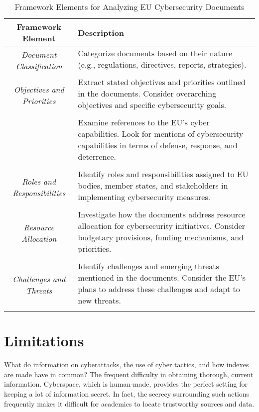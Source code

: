 \begin{table}[ht]
\centering
\caption{Framework Elements for Analyzing EU Cybersecurity Documents}
\label{tab:framework-elements}
\begin{tabular}{|c|p{8cm}|}
\hline
\textbf{Framework Element} & \textbf{Description} \\
\hline
\multirow{2}{*}{\textit{Document Classification}} & Categorize documents based on their nature (e.g., regulations, directives, reports, strategies). \\
& \\
\hline
\multirow{2}{*}{\textit{Objectives and Priorities}} & Extract stated objectives and priorities outlined in the documents. Consider overarching objectives and specific cybersecurity goals. \\
& \\
\hline\textit{}
\multirow{2}{*}{\textit{Cyber Capabilities}} & Examine references to the EU's cyber capabilities. Look for mentions of cybersecurity capabilities in terms of defense, response, and deterrence. \\
& \\
\hline
\multirow{2}{*}{\textit{Roles and Responsibilities}} & Identify roles and responsibilities assigned to EU bodies, member states, and stakeholders in implementing cybersecurity measures. \\
& \\
\hline
\multirow{2}{*}{\textit{Resource Allocation}} & Investigate how the documents address resource allocation for cybersecurity initiatives. Consider budgetary provisions, funding mechanisms, and priorities. \\
& \\
\hline
\multirow{2}{*}{\textit{Challenges and Threats}} & Identify challenges and emerging threats mentioned in the documents. Consider the EU's plans to address these challenges and adapt to new threats. \\
& \\
\hline
\end{tabular}
\end{table}

\section{Limitations}

What do information on cyberattacks, the use of cyber tactics, and how indexes are made have in common? The frequent difficulty in obtaining thorough, current information. Cyberspace, which is human-made, provides the perfect setting for keeping a lot of information secret. In fact, the secrecy surrounding such actions frequently makes it difficult for academics to locate trustworthy sources and data. 

